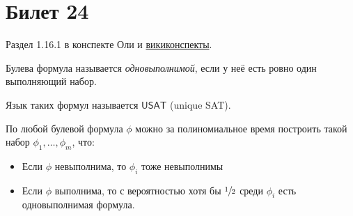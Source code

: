 \setcounter{section}{23}
\section{Билет 24}
	Раздел 1.16.1 в конспекте Оли и \href{http://neerc.ifmo.ru/wiki/index.php?title=\%D0\%A2\%D0\%B5\%D0\%BE\%D1\%80\%D0\%B5\%D0\%BC\%D0\%B0_\%D0\%92\%D0\%B0\%D0\%BB\%D0\%B8\%D0\%B0\%D0\%BD\%D1\%82\%D0\%B0-\%D0\%92\%D0\%B0\%D0\%B7\%D0\%B8\%D1\%80\%D0\%B0\%D0\%BD\%D0\%B8}{викиконспекты}.

	\begin{Def}
		Булева формула называется \textit{одновыполнимой}, если у неё есть ровно один выполняющий набор.
	\end{Def}
	\begin{Rem}
		Язык таких формул называется $\mathsf{USAT}$ (unique SAT).
	\end{Rem}

	\begin{theorem}
		По любой булевой формула $\phi$ можно за полиномиальное время построить такой набор $\phi_1, \dots, \phi_m$, что:
		\begin{itemize}
			\item Если $\phi$ невыполнима, то $\phi_i$ тоже невыполнимы
			\item Если $\phi$ выполнима, то с вероятностью хотя бы $\sfrac 12$ среди $\phi_i$ есть одновыполнимая формула.
		\end{itemize}
	\end{theorem}
